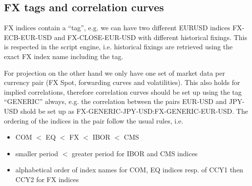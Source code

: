 \subsection{FX tags and correlation curves}\label{fxtags_correlationcurves}

FX indices contain a ``tag'', e.g. we can have two different EURUSD indices FX-ECB-EUR-USD and FX-CLOSE-EUR-USD with
different historical fixings. This is respected in the script engine, i.e. historical fixings are retrieved using the
exact FX index name including the tag.

For projection on the other hand we only have one set of market data per currency pair (FX Spot, forwarding curves and
volatilities). This also holds for implied correlations, therefore correlation curves should be set up using the tag
``GENERIC'' always, e.g. the correlation between the pairs EUR-USD and JPY-USD shold be set up as
FX-GENERIC-JPY-USD:FX-GENERIC-EUR-USD. The ordering of the indices in the pair follow the usual rules, i.e.

\begin{itemize}
\item COM $<$ EQ $<$ FX $<$ IBOR $<$ CMS
\item smaller period $<$ greater period for IBOR and CMS indices
\item alphabetical order of index names for COM, EQ indices resp. of CCY1 then CCY2 for FX indices
\end{itemize}
